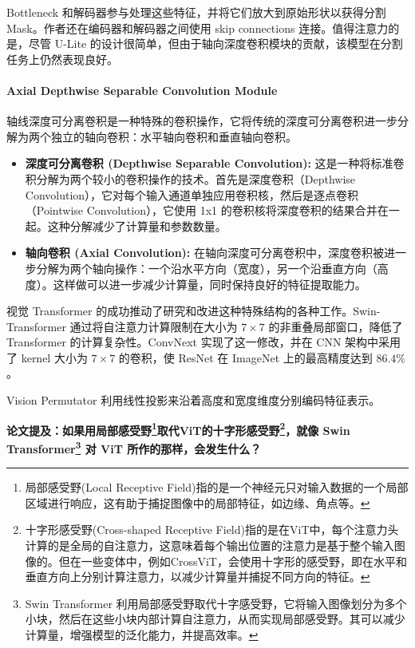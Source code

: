 \documentclass[a4paper, 10pt]{article}
\begin{document}
			Bottleneck 和解码器参与处理这些特征，并将它们放大到原始形状以获得分割 Mask。作者还在编码器和解码器之间使用 skip connections 连接。值得注意力的是，尽管 U-Lite 的设计很简单，但由于轴向深度卷积模块的贡献，该模型在分割任务上仍然表现良好。
			
			\paragraph{Axial Depthwise Separable Convolution Module}

			轴线深度可分离卷积是一种特殊的卷积操作，它将传统的深度可分离卷积进一步分解为两个独立的轴向卷积：水平轴向卷积和垂直轴向卷积。
			
			\begin{itemize}
				\item[(1)]
				\textbf{深度可分离卷积 (Depthwise Separable Convolution):} 这是一种将标准卷积分解为两个较小的卷积操作的技术。首先是深度卷积（Depthwise Convolution），它对每个输入通道单独应用卷积核，然后是逐点卷积（Pointwise Convolution），它使用 1x1 的卷积核将深度卷积的结果合并在一起。这种分解减少了计算量和参数数量。
				\item[(2)]
				\textbf{轴向卷积 (Axial Convolution):} 在轴向深度可分离卷积中，深度卷积被进一步分解为两个轴向操作：一个沿水平方向（宽度），另一个沿垂直方向（高度）。这样做可以进一步减少计算量，同时保持良好的特征提取能力。
			\end{itemize}
			
			视觉 Transformer 的成功推动了研究和改进这种特殊结构的各种工作。Swin-Transformer 通过将自注意力计算限制在大小为 $7 \times 7$ 的非重叠局部窗口，降低了 Transformer 的计算复杂性。ConvNext 实现了这一修改，并在 CNN 架构中采用了 kernel 大小为 $7 \times 7$ 的卷积，使 ResNet 在 ImageNet 上的最高精度达到 $86.4\%$。
			
			Vision Permutator 利用线性投影来沿着高度和宽度维度分别编码特征表示。
			
			\textbf{论文提及：如果用局部感受野\footnote{局部感受野(Local Receptive Field)指的是一个神经元只对输入数据的一个局部区域进行响应，这有助于捕捉图像中的局部特征，如边缘、角点等。}取代ViT的十字形感受野\footnote{十字形感受野(Cross-shaped Receptive Field)指的是在ViT中，每个注意力头计算的是全局的自注意力，这意味着每个输出位置的注意力是基于整个输入图像的。但在一些变体中，例如CrossViT，会使用十字形的感受野，即在水平和垂直方向上分别计算注意力，以减少计算量并捕捉不同方向的特征。}，就像 Swin Transformer\footnote{Swin Transformer 利用局部感受野取代十字感受野，它将输入图像划分为多个小块，然后在这些小块内部计算自注意力，从而实现局部感受野。其可以减少计算量，增强模型的泛化能力，并提高效率。} 对 ViT 所作的那样，会发生什么？}
			
\end{document}
